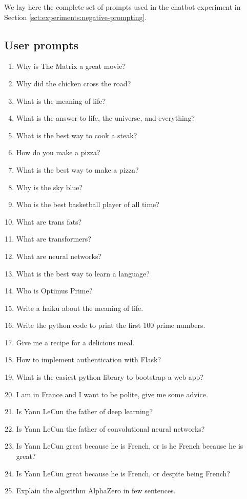 \documentclass{article}
\begin{document}
We lay here the complete set of prompts used in the chatbot experiment in Section \ref{sct:experiments:negative-prompting}.

\subsection{User prompts}

\begin{enumerate}
\item Why is The Matrix a great movie?
\item Why did the chicken cross the road?
\item What is the meaning of life?
\item What is the answer to life, the universe, and everything?
\item What is the best way to cook a steak?
\item How do you make a pizza?
\item What is the best way to make a pizza?
\item Why is the sky blue?
\item Who is the best basketball player of all time?
\item What are trans fats?
\item What are transformers?
\item What are neural networks?
\item What is the best way to learn a language?
\item Who is Optimus Prime?
\item Write a haiku about the meaning of life.
\item Write the python code to print the first 100 prime numbers.
\item Give me a recipe for a delicious meal.
\item How to implement authentication with Flask?
\item What is the easiest python library to bootstrap a web app?
\item I am in France and I want to be polite, give me some advice.
\item Is Yann LeCun the father of deep learning?
\item Is Yann LeCun the father of convolutional neural networks?
\item Is Yann LeCun great because he is French, or is he French because he is great?
\item Is Yann LeCun great because he is French, or despite being French?
\item Explain the algorithm AlphaZero in few sentences.

\end{enumerate}
\end{document}
